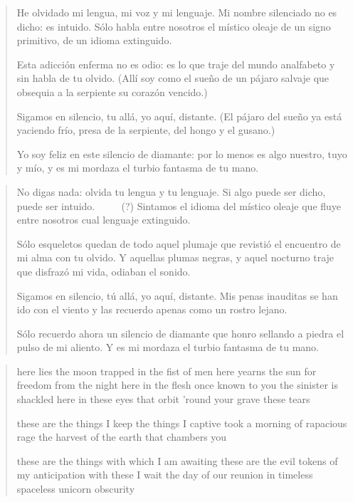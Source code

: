 \documentclass[a4paper, 12pt]{article}
\begin{document}
\pagebreak


\pagebreak

\begin{verse}
    He olvidado mi lengua, mi voz y mi lenguaje.
    Mi nombre silenciado no es dicho: es intuido.
    Sólo habla entre nosotros el místico oleaje 
    de un signo primitivo, de un idioma extinguido.

    Esta adicción enferma no es odio: es lo que traje
    del mundo analfabeto y sin habla de tu olvido.
    (Allí soy como el sueño de un pájaro salvaje 
    que obsequia a la serpiente su corazón vencido.)

    Sigamos en silencio, tu allá, yo aquí, distante.
    (El pájaro del sueño ya está yaciendo frío,
    presa de la serpiente, del hongo y el gusano.)

    Yo soy feliz en este silencio de diamante:
    por lo menos es algo nuestro, tuyo y mío,
    y es mi mordaza el turbio fantasma de tu mano.

    \end{verse}

\pagebreak

\begin{verse}
   No digas nada: olvida tu lengua y tu lenguaje.
   Si algo puede ser dicho, puede ser intuido. $\qquad$ (?)
   Sintamos el idioma del místico oleaje 
   que fluye entre nosotros cual lenguaje extinguido.

   Sólo esqueletos quedan de todo aquel plumaje 
   que revistió el encuentro de mi alma con tu olvido.
   Y aquellas plumas negras, y aquel nocturno traje
   que disfrazó mi vida, odiaban el sonido.

   Sigamos en silencio, tú allá, yo aquí, distante.
   Mis penas inauditas se han ido con el viento 
   y las recuerdo apenas como un rostro lejano.

   Sólo recuerdo ahora un silencio de diamante
   que honro sellando a piedra el pulso de mi aliento.
   Y es mi mordaza el turbio fantasma de tu mano.
   

\end{verse}

\pagebreak 

\begin{verse}
    here lies the moon trapped in the fist of men 
    here yearns the sun for freedom from the night 
    here in the flesh once known to you the sinister is shackled
    here in these eyes that orbit 'round your grave these tears

    these are the things I keep
    the things I captive took a morning of rapacious rage
    the harvest of the earth that chambers you

    these are the things with which I am awaiting 
    these are the evil tokens of my anticipation
    with these I wait the day of our reunion 
    in timeless spaceless unicorn obscurity 


\end{verse}
\end{document}

